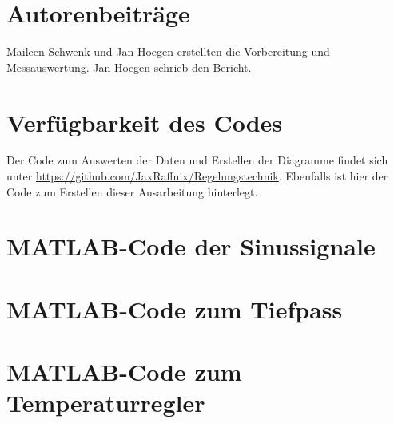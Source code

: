 \documentclass[
    paper=a4,
    fontsize=10pt,
    DIV=13,
    oneside,
]{scrartcl}
\begin{document}

\printbibliography[heading=bibnumbered]

\section{Autorenbeiträge}
    Maileen Schwenk und Jan Hoegen erstellten die Vorbereitung und Messauswertung. Jan Hoegen schrieb den Bericht.

\section{Verfügbarkeit des Codes}
    Der Code zum Auswerten der Daten und Erstellen der Diagramme findet sich unter \url{https://github.com/JaxRaffnix/Regelungstechnik}. Ebenfalls ist hier der Code zum Erstellen dieser Ausarbeitung hinterlegt.


\appendix

\section{MATLAB-Code der Sinussignale}
    

\section{MATLAB-Code zum Tiefpass}
    

\section{MATLAB-Code zum Temperaturregler}
    
\end{document}
